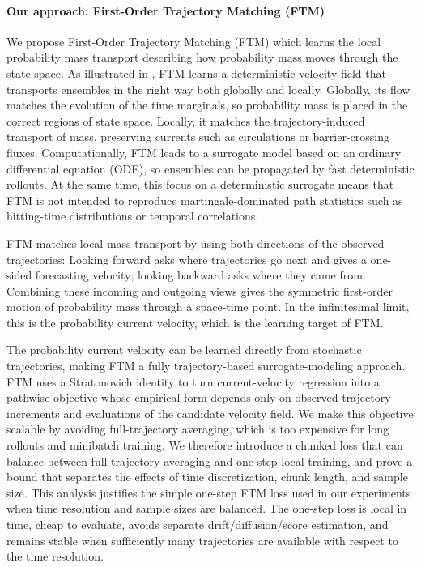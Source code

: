 \documentclass[oneside,11pt]{article}
\theoremstyle{remark}
\begin{document}
\paragraph{Our approach: First-Order Trajectory Matching (FTM)}
We propose First-Order Trajectory Matching (FTM) which learns the local probability mass transport describing how probability mass moves through the state space. As illustrated in , FTM learns a deterministic velocity field that transports ensembles in the right way both globally and locally. Globally, its flow matches the evolution of the time marginals, so probability mass is placed in the correct regions of state space. Locally, it matches the trajectory-induced transport of mass, preserving currents such as circulations or barrier-crossing fluxes. Computationally, FTM leads to a surrogate model based on an ordinary differential equation (ODE), so ensembles can be propagated by fast deterministic rollouts.
At the same time, this focus on a deterministic surrogate means that FTM is not intended to reproduce martingale-dominated path statistics such as hitting-time distributions or temporal correlations.

FTM matches local mass transport by using both directions of the observed trajectories:  Looking forward asks where trajectories go next and gives a one-sided forecasting velocity; looking backward asks where they came from. Combining these incoming and outgoing views gives the symmetric first-order motion of probability mass through a space-time point. In the infinitesimal limit, this is the probability current velocity, which is the learning target of FTM. 

The probability current velocity can be learned directly from stochastic trajectories, making FTM a fully trajectory-based surrogate-modeling approach. 
FTM uses a Stratonovich identity to turn current-velocity regression into a pathwise objective whose empirical form depends only on observed trajectory increments and evaluations of the candidate velocity field. We make this objective scalable by avoiding full-trajectory averaging, which is  too expensive for long rollouts and minibatch training. We therefore introduce a chunked loss that can balance between full-trajectory averaging and one-step local training, and prove a bound that separates the effects of time discretization, chunk length, and sample size. This analysis justifies the simple one-step FTM loss used in our experiments when time resolution and sample sizes are balanced. The one-step loss is local in time, cheap to evaluate, avoids separate drift/diffusion/score estimation, and remains stable when sufficiently many trajectories are available with respect to the time resolution.
\end{document}
